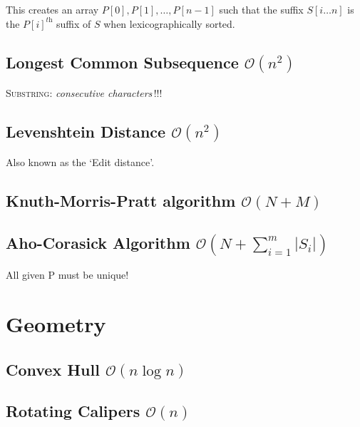 \documentclass[8pt,a4paper,landscape,oneside]{amsart}
\begin{document}
\begin{multicols*}{3}
This creates an array $P[0], P[1], \dots, P[n-1]$ such that the suffix $S[i \dots n]$ is the $P[i]^\textit{th}$ suffix of $S$ when lexicographically sorted.



\subsection{Longest Common Subsequence $\mathcal{O}(n^{2})$}
\textsc{Substring}: \textit{consecutive characters}\,!!!



\subsection{Levenshtein Distance $\mathcal{O}(n^{2})$}

Also known as the `Edit distance'.



\subsection{Knuth-Morris-Pratt algorithm $\mathcal{O}(N + M)$}



\subsection{Aho-Corasick Algorithm $\mathcal{O}(N + \sum_{i=1}^{m} |S_i|)$}

All given P must be unique!



\section{Geometry}



\subsection{Convex Hull $\mathcal{O}(n \log n)$}



\subsection{Rotating Calipers $\mathcal{O}(n)$}


\end{multicols*}
\end{document}
